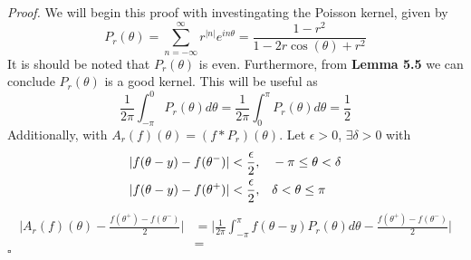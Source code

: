 \documentclass[12pt]{article}
\newenvironment{proof}{\textit{Proof.}}{\hfill$\square$}
\begin{document}
\vspace{2em}
\begin{proof}
    We will begin this proof with investingating the Poisson kernel, given by
    \begin{equation*}
        P_r(\theta)=\sum_{n=-\infty}^{\infty}r^{|n|}e^{in\theta}=\frac{1-r^2}{1-2r\cos(\theta)+r^2}
    \end{equation*}
    It is should be noted that $P_r(\theta)$ is even. Furthermore, from \textbf{Lemma 5.5} we can conclude $P_r(\theta)$ is a good kernel.
    This will be useful as
    \begin{equation*}
        \frac{1}{2\pi}\int_{-\pi}^{0}P_r(\theta)d\theta = \frac{1}{2\pi}\int_{0}^{\pi}P_r(\theta)d\theta=\frac{1}{2}
    \end{equation*}
    Additionally, with $A_r(f)(\theta)=(f*P_r)(\theta)$. Let $\epsilon>0$, $\exists\delta>0$ with
    \begin{align}
        |f(\theta-y)-f(\theta^-)|<\frac{\epsilon}{2},&\hspace{1em}-\pi\le\theta<\-\delta \\
        |f(\theta-y)-f(\theta^+)|<\frac{\epsilon}{2},&\hspace{1em}\delta<\theta\le\pi
    \end{align}
    \begin{align*}
        \Big|A_r(f)(\theta)- \frac{f(\theta^+)-f(\theta^-)}{2}\Big|&=\Big|\frac{1}{2\pi}\int_{-\pi}^{\pi}f(\theta-y)P_r(\theta)d\theta-\frac{f(\theta^+)-f(\theta^-)}{2}\Big| \\
        &=
    \end{align*}
\end{proof}
\end{document}
